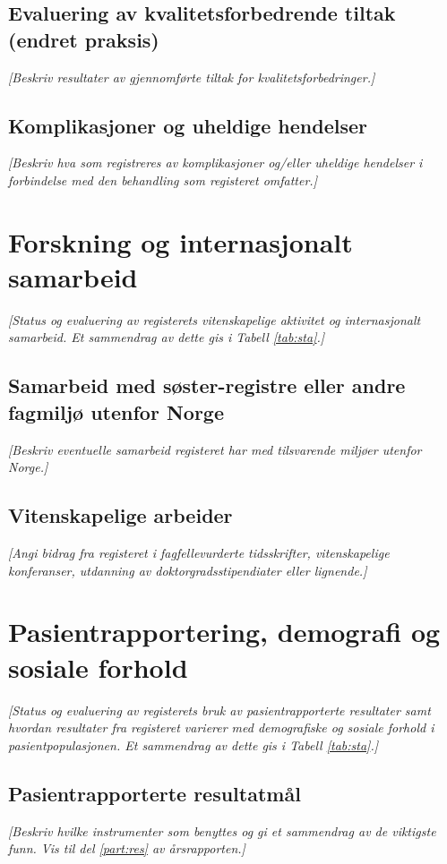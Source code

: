 \documentclass[norsk, a4paper, twocolumn]{report}
\newcommand{\guide}[1] {
	\textit{[\textcolor{guidegray}{#1}]}
	}
\begin{document}
\section{Evaluering av kvalitetsforbedrende tiltak (endret praksis)}\label{sec:evakva}
\guide{Beskriv resultater av gjennomførte tiltak for kvalitetsforbedringer.}

\section{Komplikasjoner og uheldige hendelser}\label{sec:kom}
\guide{Beskriv hva som registreres av komplikasjoner og/eller uheldige
hendelser i forbindelse med den behandling som registeret omfatter.}

\chapter{Forskning og internasjonalt samarbeid}\label{cha:for}
\guide{Status og evaluering av registerets vitenskapelige aktivitet og
internasjonalt samarbeid. Et sammendrag av dette gis i Tabell 
\ref{tab:sta}.}

\section{Samarbeid med søster-registre eller andre fagmiljø utenfor Norge}\label{sec:samfag}
\guide{Beskriv eventuelle samarbeid registeret har med tilsvarende miljøer
utenfor Norge.}

\section{Vitenskapelige arbeider}\label{sec:vitarb}
\guide{Angi bidrag fra registeret i fagfellevurderte tidsskrifter,
vitenskapelige konferanser, utdanning av doktorgradsstipendiater eller
lignende.}


\chapter{Pasientrapportering, demografi og sosiale forhold}\label{cha:pas}
\guide{Status og evaluering av registerets bruk av pasientrapporterte
resultater samt
hvordan resultater fra registeret varierer med demografiske og sosiale forhold
i pasientpopulasjonen. Et sammendrag av dette gis i Tabell \ref{tab:sta}.}

\section{Pasientrapporterte resultatmål}\label{sec:pasutk}
\guide{Beskriv hvilke instrumenter som benyttes og gi et sammendrag av de
viktigste funn. Vis til del \ref{part:res} av årsrapporten.}
\end{document}
